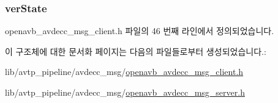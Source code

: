 \subsubsection[{\texorpdfstring{ver\+State}{verState}}]{ ver\+State}\hypertarget{struct__avdecc__msg__state_a9739291b2bb9fba83a1eb09aaeb4dc92}{}\label{struct__avdecc__msg__state_a9739291b2bb9fba83a1eb09aaeb4dc92}


openavb\+\_\+avdecc\+\_\+msg\+\_\+client.\+h 파일의 46 번째 라인에서 정의되었습니다.



이 구조체에 대한 문서화 페이지는 다음의 파일들로부터 생성되었습니다.\+:\begin{DoxyCompactItemize}
\item 
lib/avtp\+\_\+pipeline/avdecc\+\_\+msg/\hyperlink{openavb__avdecc__msg__client_8h}{openavb\+\_\+avdecc\+\_\+msg\+\_\+client.\+h}\item 
lib/avtp\+\_\+pipeline/avdecc\+\_\+msg/\hyperlink{openavb__avdecc__msg__server_8h}{openavb\+\_\+avdecc\+\_\+msg\+\_\+server.\+h}\end{DoxyCompactItemize}
